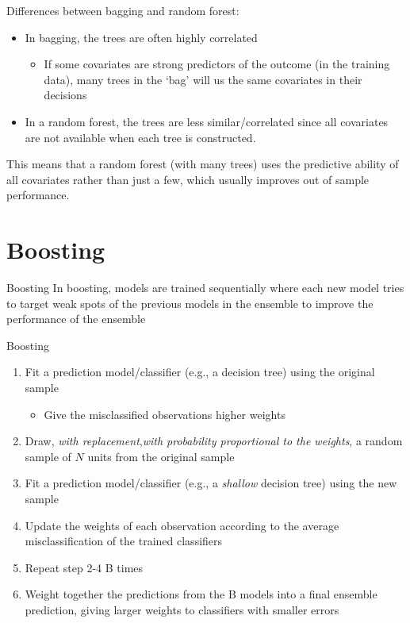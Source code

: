 \documentclass[11pt,aspectratio=1610,usenames,dvipsnames]{beamer} %
\begin{document}
\begin{frame}{Differences between bagging and random forest:}
	\begin{itemize}
		\item In bagging, the trees are often highly correlated
		\begin{itemize}
			\item If some covariates are strong predictors of the outcome (in the training data), many trees in the `bag' will us the same covariates in their decisions
		\end{itemize}
		\item In a random forest, the trees are less similar/correlated since all covariates are not available when each tree is constructed.
	\end{itemize}
	This means that a random forest (with many trees) uses the predictive ability of all covariates rather than just a few, which usually improves out of sample performance.
	
\end{frame}





\section{Boosting}

\begin{frame}{Boosting}
	In boosting, models are trained sequentially where each new model tries to target weak spots of the previous models in the ensemble to improve the performance of the ensemble
	
	Boosting
	\begin{enumerate}
		
		\item Fit a prediction model/classifier (e.g., a decision tree) using the original sample
		\begin{itemize}
			\item Give the misclassified observations higher weights
		\end{itemize}
		\item Draw, \textit{with replacement},\textit{with probability proportional to the weights}, a random sample of $N$ units from the original sample
		\item Fit a prediction model/classifier (e.g., a \emph{shallow} decision tree) using the new sample
		\item Update the weights of each observation according to the average misclassification of the trained classifiers
		\item Repeat step 2-4 B times
		\item Weight together the predictions from the B models into a final ensemble prediction, giving larger weights to classifiers with smaller errors
	\end{enumerate}
	
\end{frame}
\end{document}
